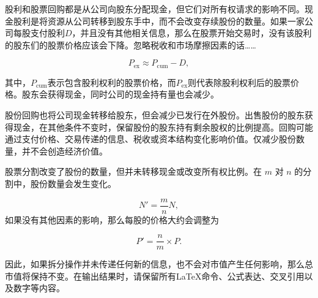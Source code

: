 股利和股票回购都是从公司向股东分配现金，但它们对所有权请求的影响不同。现金股利是将资源从公司转移到股东手中，而不会改变存续股份的数量。如果一家公司每股支付股利\(D\)，并且没有其他相关信息，那么在股票开始交易时，没有该股利的股东们的股票价格应该会下降。忽略税收和市场摩擦因素的话……

\begin{equation}
P_{\mathrm{ex}}
\approx
P_{\mathrm{cum}}-D,
\label{eq:ch9-ex-dividend-price}
\end{equation}

其中，\(P_{\mathrm{cum}}\)表示包含股利权利的股票价格，而\(P_{\mathrm{ex}}\)则代表除股利权利后的股票价格。股东会获得现金，同时公司的现金持有量也会减少。

股份回购也将公司现金转移给股东，但会减少已发行在外股份。出售股份的股东获得现金，在其他条件不变时，保留股份的股东持有剩余股权的比例提高。回购可能通过支付价格、交易传递的信息、税收或资本结构变化影响价值。仅减少股份数量，并不会创造经济价值。

股票分割改变了股份的数量，但并未转移现金或改变所有权比例。在 \(m\) 对 \(n\) 的分割中，股份数量会发生变化。

\begin{equation}
N'=\frac{m}{n}N,
\label{eq:ch9-stock-split-shares}
\end{equation}
如果没有其他因素的影响，那么每股的价格大约会调整为

\begin{equation}
P'=\frac{n}{m}\times P.
\label{eq:ch9-stock-split-price}
\end{equation}

因此，如果拆分操作并未传递任何新的信息，也不会对市值产生任何影响，那么总市值将保持不变。在输出结果时，请保留所有LaTeX命令、公式表达、交叉引用以及数字等内容。


